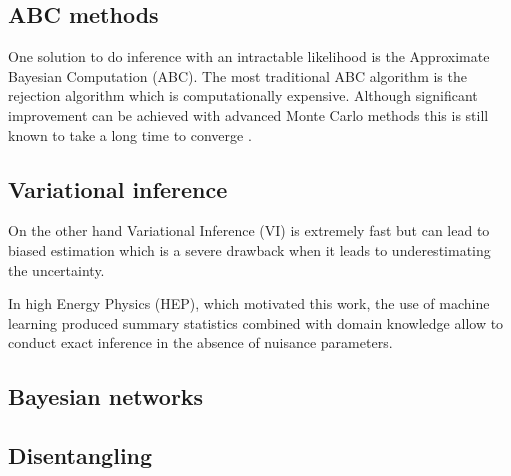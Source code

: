 
\subsection{ABC methods} %
\label{sub:abc_methods}



One solution to do inference with an intractable likelihood is the Approximate Bayesian Computation (ABC).
The most traditional ABC algorithm is the rejection algorithm which is computationally expensive.
Although significant improvement can be achieved with advanced Monte Carlo methods this is still known to take a long time to converge \needcite.


\subsection{Variational inference} %
\label{sub:variational_inference}


On the other hand Variational Inference (VI) is extremely fast but can lead to biased estimation which is a severe drawback when it leads to underestimating the uncertainty.

In high Energy Physics (HEP), which motivated this work, the use of machine learning produced summary statistics combined with domain knowledge allow to conduct exact inference in the absence of nuisance parameters.


\subsection{Bayesian networks} %
\label{sub:bayesian_networks}



\subsection{Disentangling} %
\label{sub:disentangling}

